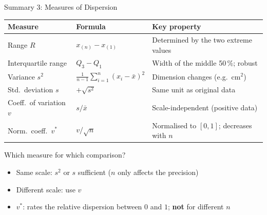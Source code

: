 \documentclass[aspectratio=169,11pt]{beamer}
\begin{document}
\begin{frame}{Summary 3: Measures of Dispersion}
  \begin{center}
    \small\renewcommand{\arraystretch}{1.05}
    \begin{tabular}{lll}
      \toprule
      \textbf{Measure} & \textbf{Formula} & \textbf{Key property} \\
      \midrule
      Range $R$ & $x_{(n)} - x_{(1)}$ & Determined by the two extreme values \\
      Interquartile range & $Q_3 - Q_1$ & Width of the middle 50\,\%; robust \\
      Variance $s^2$ & $\frac{1}{n-1}\sum_{i=1}^{n}(x_i - \bar{x})^2$ & Dimension changes (e.g.\ cm$^2$) \\
      Std.\ deviation $s$ & $+\sqrt{s^2}$ & Same unit as original data \\
      Coeff.\ of variation $v$ & $s / \bar{x}$ & Scale-independent (positive data) \\
      Norm.\ coeff.\ $v^*$ & $v / \sqrt{n}$ & Normalised to $[0, 1]$; decreases with $n$ \\
      \bottomrule
    \end{tabular}
  \end{center}

  \begin{block}{Which measure for which comparison?}
    \begin{itemize}
      \item Same scale: $s^2$ or $s$ sufficient ($n$ only affects the precision)
      \item Different scale: use $v$
      \item $v^*$: rates the relative dispersion between $0$ and $1$; \textbf{not} for different $n$
    \end{itemize}
  \end{block}
\end{frame}
\end{document}
